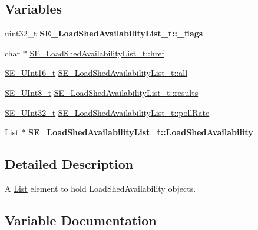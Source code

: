 \subsection*{Variables}
\begin{DoxyCompactItemize}
\item 
\mbox{\label{group__LoadShedAvailabilityList_ga7d816de65ecbeda7beb76a4617be416d}} 
uint32\+\_\+t {\bfseries S\+E\+\_\+\+Load\+Shed\+Availability\+List\+\_\+t\+::\+\_\+flags}
\item 
char $\ast$ \hyperlink{group__LoadShedAvailabilityList_ga759f6f998744203770c7908f3f157784}{S\+E\+\_\+\+Load\+Shed\+Availability\+List\+\_\+t\+::href}
\item 
\hyperlink{group__UInt16_gac68d541f189538bfd30cfaa712d20d29}{S\+E\+\_\+\+U\+Int16\+\_\+t} \hyperlink{group__LoadShedAvailabilityList_gaedd3746993d4fb321cdb00aa48c41e92}{S\+E\+\_\+\+Load\+Shed\+Availability\+List\+\_\+t\+::all}
\item 
\hyperlink{group__UInt8_gaf7c365a1acfe204e3a67c16ed44572f5}{S\+E\+\_\+\+U\+Int8\+\_\+t} \hyperlink{group__LoadShedAvailabilityList_gab30e5d3f4e29c7b26f294be2f5563a4f}{S\+E\+\_\+\+Load\+Shed\+Availability\+List\+\_\+t\+::results}
\item 
\hyperlink{group__UInt32_ga70bd4ecda3c0c85d20779d685a270cdb}{S\+E\+\_\+\+U\+Int32\+\_\+t} \hyperlink{group__LoadShedAvailabilityList_gacd95c2260e71af84870c073faceef2bc}{S\+E\+\_\+\+Load\+Shed\+Availability\+List\+\_\+t\+::poll\+Rate}
\item 
\mbox{\label{group__LoadShedAvailabilityList_gafe4406fc065cce546b5ef78eb7a4422f}} 
\hyperlink{structList}{List} $\ast$ {\bfseries S\+E\+\_\+\+Load\+Shed\+Availability\+List\+\_\+t\+::\+Load\+Shed\+Availability}
\end{DoxyCompactItemize}


\subsection{Detailed Description}
A \hyperlink{structList}{List} element to hold Load\+Shed\+Availability objects. 

\subsection{Variable Documentation}
\mbox{\label{group__LoadShedAvailabilityList_gaedd3746993d4fb321cdb00aa48c41e92}} 
